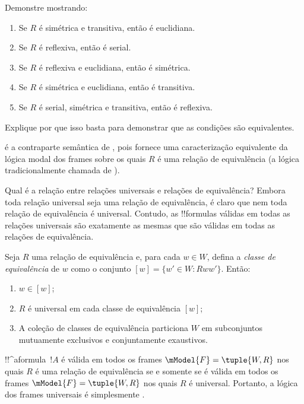 \documentclass[../../../include/open-logic-section]{subfiles}
\begin{document}
\begin{prob}
  Demonstre  mostrando:
  \begin{enumerate}
  \item Se $R$ é simétrica e transitiva, então é euclidiana.
  \item Se $R$ é reflexiva, então é serial.
  \item Se $R$ é reflexiva e euclidiana, então é simétrica.
  \item Se $R$ é simétrica e euclidiana, então é transitiva.
  \item Se $R$ é serial, simétrica e transitiva, então é reflexiva.
  \end{enumerate}
  Explique por que isso basta para demonstrar que as condições são
  equivalentes.
\end{prob}

 é a contraparte semântica de
, pois fornece uma caracterização equivalente da
lógica modal dos frames sobre os quais $R$ é uma relação de equivalência (a
lógica tradicionalmente chamada de ).

Qual é a relação entre relações universais e relações de equivalência? Embora
toda relação universal seja uma relação de equivalência, é claro que nem toda
relação de equivalência é universal. Contudo, as !!{formula}s válidas em todas
as relações universais são exatamente as mesmas que são válidas em todas as
relações de equivalência.

\begin{prop}
  Seja $R$ uma relação de equivalência e, para cada $w \in W$, defina a
  \emph{classe de equivalência} de $w$ como o conjunto
  $[w] = \{w'\in W : Rww'\}$. Então:
  \begin{enumerate}
  \item $w \in [w]$;
  \item $R$ é universal em cada classe de equivalência $[w]$;
  \item A coleção de classes de equivalência particiona $W$ em subconjuntos
    mutuamente exclusivos e conjuntamente exaustivos.
  \end{enumerate}
\end{prop}

\begin{prop}
  !!^a{formula}~$!A$ é válida em todos os frames
  $\mModel{F} =\tuple{W,R}$ nos quais $R$ é uma relação de equivalência se e
  somente se é válida em todos os frames $\mModel{F} =\tuple{W,R}$ nos quais
  $R$ é universal. Portanto, a lógica dos frames universais é simplesmente
  .
\end{prop}
\end{document}
